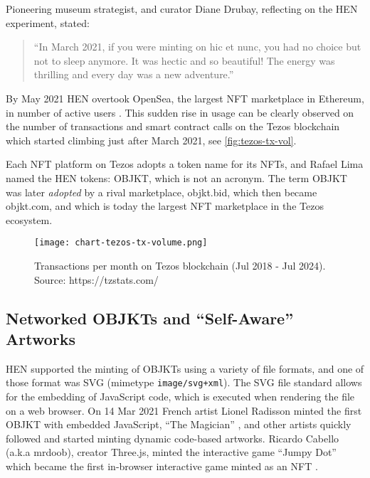 Pioneering museum strategist, and curator Diane Drubay, reflecting on the HEN experiment, stated:

\begin{quotation}
``In March 2021, if you were minting on hic et nunc, you had no choice but not to sleep anymore. It was hectic and so beautiful! The energy was thrilling and every day was a new adventure.'' \cite{drubayHowHicNunc2021}
\end{quotation}


By May 2021 HEN overtook OpenSea, the largest NFT marketplace in Ethereum, in number of active users \cite{nelsonWhereAreYour2022} \cite{evansBrazilDIYEcofriendly2021}. This sudden rise in usage can be clearly observed on the number of transactions and smart contract calls on the Tezos blockchain which started climbing just after March 2021, see \autoref{fig:tezos-tx-vol}.

Each NFT platform on Tezos adopts a token name for its NFTs, and Rafael Lima named the HEN tokens: \gls{OBJKT}, which is not an acronym.
The term OBJKT was later \emph{adopted} by a rival marketplace, objkt.bid, which then became objkt.com, and which is today the largest NFT marketplace in the Tezos ecosystem.

\begin{figure}[h]
    \centering
    \texttt{[image: chart-tezos-tx-volume.png]}
    \caption[Transactions per month on Tezos blockchain]{Transactions per month on Tezos blockchain (Jul 2018 - Jul 2024). Source: https://tzstats.com/}
    \label{fig:tezos-tx-vol}
\end{figure}

\subsection*{Networked OBJKTs and ``Self-Aware'' Artworks}

HEN supported the minting of OBJKTs using a variety of file formats, and one of those format was SVG (mimetype \texttt{image/svg+xml}). The SVG file standard allows for the embedding of JavaScript code, which is executed when rendering the file on a web browser.  On 14 Mar 2021 French artist Lionel Radisson minted the first OBJKT with embedded JavaScript, ``The Magician''  \cite{makio135Magician2021}, and other artists quickly followed and started minting dynamic code-based artworks. Ricardo Cabello (a.k.a mrdoob), creator Three.js, minted the interactive game ``Jumpy Dot'' \cite{mrdoobJumpyDot2021} which became the first in-browser interactive game minted as an NFT \cite{rusherWhatDoesIt2021}.

